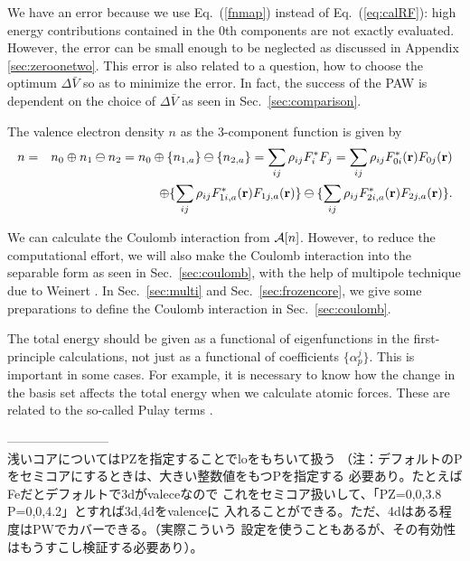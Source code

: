 \documentclass[a4paper,10pt,aip,onecolumn,amsmath,amssymb,floatfix,rmp]{revtex4-1}
\newcommand{\bfr}{{\bf r}}
\newcommand{\ooplus}{\oplus}
\newcommand{\oominus}{\ominus}
\def\calR{{\cal A}}
\newcommand{\req}[1]{\mbox{Eq.~\!(\ref{#1})}}
\newcommand{\refsec}[1]{\mbox{Sec.~\!\ref{#1}}}
\def\rhoij{\rho_{ij}}
\begin{document}
\begin{widetext}
\begin{widetext}
We have an error because we use \req{fnmap} instead of \req{eq:calRF}:
high energy contributions contained in the 0th components are not
exactly evaluated. However, the error can be small enough to be
neglected as discussed in Appendix \ref{sec:zeroonetwo}.  This error is
also related to a question, how to choose the optimum $\Delta \bar{V}$
so as to minimize the error.  In fact, the success of the PAW \cite{PAW}
is dependent on the choice of $\Delta \bar{V}$ as seen in
\refsec{sec:comparison}.

The valence electron density $n$ as the 3-component function is given by
\begin{eqnarray}
n &=&n_0\ooplus n_1 \oominus n_2 = n_0 \ooplus \{n_{1,a}\} \oominus \{n_{2,a}\} =
\sum_{ij} \rhoij F_i^* F_j = \sum_{ij}
 \rhoij F^*_{0i}(\bfr)F_{0j}(\bfr) \nonumber \\
&&\ooplus  \{ \sum_{ij} \rhoij F^*_{1i,a}(\bfr)F_{1j,a}(\bfr) \}
\oominus   \{ \sum_{ij} \rhoij F^*_{2i,a}(\bfr)F_{2j,a}(\bfr) \}. \label{eq:n}
\end{eqnarray}
\end{widetext}
We can calculate the Coulomb interaction from $\calR[n]$. 
However, to reduce the computational effort, 
we will also make the Coulomb interaction into the separable form as
seen in \refsec{sec:coulomb}, with the help of multipole technique
due to Weinert \cite{weinert81}.
In \refsec{sec:multi} and \refsec{sec:frozencore}, we give some
preparations to define the Coulomb interaction in \refsec{sec:coulomb}.

The total energy should be given as a functional of eigenfunctions in
the first-principle calculations, not just as a functional of
coefficients $\{\alpha^j_p\}$.  This is important in some cases. For
example, it is necessary to know how the change in the basis set affects
the total energy when we calculate atomic forces. These are related to
the so-called Pulay terms \cite{pulay69}.

------------------------\\
浅いコアについてはPZを指定することでloをもちいて扱う
（注：デフォルトのPをセミコアにするときは、大きい整数値をもつPを指定する
必要あり。たとえばFeだとデフォルトで3dがvaleceなので
これをセミコア扱いして、「PZ=0,0,3.8 P=0,0,4.2」とすれば3d,4dをvalenceに
入れることができる。ただ、4dはある程度はPWでカバーできる。（実際こういう
設定を使うこともあるが、その有効性はもうすこし検証する必要あり）。


\end{widetext}
\end{document}

